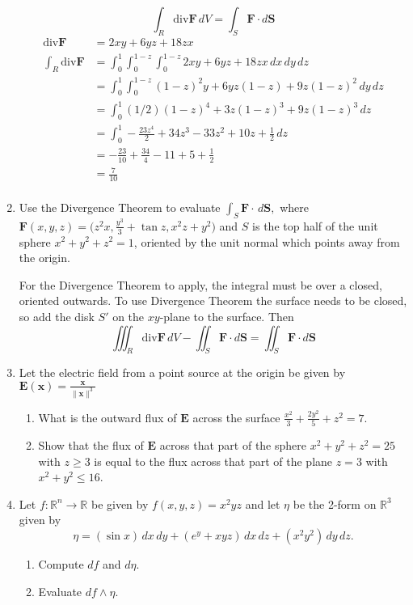 \documentclass{article}
\newcommand{\norm}[1]{\| #1 \|}
\newcommand{\divt}{\text{div}}
\begin{document}
\begin{enumerate}
            \[\int_R \divt \boldsymbol F \, dV = \int_S \boldsymbol F \cdot d\boldsymbol S\]
            \begin{align*}
                \divt \boldsymbol F &= 2xy + 6yz + 18zx \\
                \int_R \divt \boldsymbol F &= \int_0^1 \int_0^{1-z} \int_0^{1-z} 2xy + 6yz + 18zx \, dx \, dy \, dz \\
                &= \int_0^1 \int_0^{1-z} (1-z)^2y + 6yz(1-z) + 9z(1-z)^2 \, dy \, dz \\
                &= \int_0^1 (1/2)(1-z)^4 + 3z(1-z)^3 + 9z(1-z)^3 \, dz \\
                &= \int_0^1 -\frac{23z^4}{2} + 34z^3 - 33z^2 + 10z + \frac{1}{2} \, dz \\
                &= -\frac{23}{10} + \frac{34}{4} - 11 + 5 + \frac{1}{2} \\
                &= \frac{7}{10} \\ 
            \end{align*}
            \newpage
\item Use the Divergence Theorem to evaluate $\displaystyle \int_S \boldsymbol F \cdot \, d \boldsymbol S,$ where $\displaystyle \boldsymbol F (x,y,z) = \bigg(z^2 x, \frac{y^3}{3} + \tan z, x^2z+y^2 \bigg)$ and $S$ is the top half of the unit sphere $x^2 + y^2 + z^2 = 1$, oriented by the unit normal which points away from the origin.
    
    For the Divergence Theorem to apply, the integral must be over a closed, oriented outwards. To use Divergence Theorem the surface needs to be closed, so add the disk $S'$ on the $xy$-plane to the surface. Then 
    \[\iiint_R \divt \boldsymbol F \, dV - \iint_S \boldsymbol F \cdot d \boldsymbol S = \iint_S \boldsymbol F \cdot d\boldsymbol S\]

\item Let the electric field from a point source at the origin be given by $\displaystyle \boldsymbol E (\boldsymbol x) = \frac{\boldsymbol x}{\norm{\boldsymbol x}^3}$
    \begin{enumerate}
        \item What is the outward flux of $\boldsymbol E$ across the surface $\displaystyle \frac{x^2}{3} + \frac{2y^2}{5} + z^2 = 7$.
        \item Show that the flux of $\boldsymbol E$ across that part of the sphere $x^2 + y^2 + z^2 = 25$ with $z \geq 3$ is equal to the flux across that part of the plane $z = 3$ with $x^2 + y^2 \leq 16$.
    \end{enumerate} 
    \item Let $f : \mathbb{R}^n \rightarrow \mathbb{R}$ be given by $f(x,y,z) = x^2yz$ and let $\eta$ be the 2-form on $\mathbb{R}^3$ given by \[ \eta = (\sin x) \, dx \, dy + (e^y + xyz) \, dx \, dz + (x^2y^2) \, dy \, dz .\]
    \begin{enumerate}
        \item Compute $df$ and $d\eta$.
        \item Evaluate $df \wedge \eta$.
    \end{enumerate} 
\end{enumerate}
\end{document}
